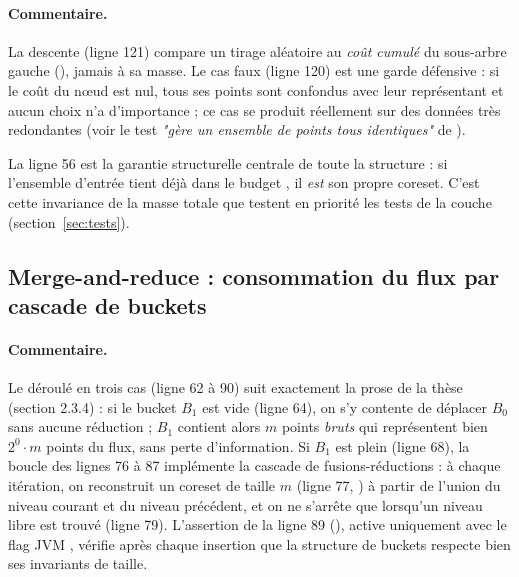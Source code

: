 

\paragraph{Commentaire.} La descente (ligne 121) compare un tirage aléatoire
au \emph{coût cumulé} du sous-arbre gauche (), jamais à
sa masse. Le cas  faux (ligne 120) est une garde
défensive : si le coût du nœud est nul, tous ses points sont confondus avec
leur représentant et aucun choix n'a d'importance ; ce cas se produit
réellement sur des données très redondantes (voir le test \emph{"gère un
ensemble de points tous identiques"} de ).



La ligne 56 est la garantie structurelle centrale de toute la structure :
si l'ensemble d'entrée tient déjà dans le budget , il \emph{est} son
propre coreset. C'est cette invariance de la masse totale que testent en
priorité les tests de la couche  (section~\ref{sec:tests}).

\subsection{Merge-and-reduce : consommation du flux par cascade de buckets}



\paragraph{Commentaire.} Le déroulé en trois cas (ligne 62 à 90) suit
exactement la prose de la thèse (section 2.3.4) : si le bucket $B_1$ est
vide (ligne 64), on s'y contente de déplacer $B_0$ sans aucune réduction ;
$B_1$ contient alors $m$ points \emph{bruts} qui représentent bien $2^0\cdot
m$ points du flux, sans perte d'information. Si $B_1$ est plein (ligne 68),
la boucle  des lignes 76 à 87 implémente la cascade de
fusions-réductions : à chaque itération, on reconstruit un coreset de taille
$m$ (ligne 77, ) à partir de l'union du niveau
courant et du niveau précédent, et on ne s'arrête que lorsqu'un niveau libre
est trouvé (ligne 79). L'assertion de la ligne 89
(), active uniquement avec le flag JVM ,
vérifie après chaque insertion que la structure de buckets respecte bien
ses invariants de taille.

